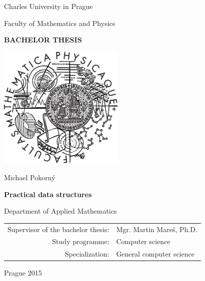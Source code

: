\documentclass[12pt,a4paper]{report}
\begin{document}


\pagestyle{empty}
\begin{center}

\large

Charles University in Prague

\medskip

Faculty of Mathematics and Physics

\vfill

{\bf\Large BACHELOR THESIS}

\vfill

\centerline{\mbox{\includegraphics[width=60mm]{img/logo.eps}}}

\vfill
\vspace{5mm}

{\LARGE Michael Pokorný}

\vspace{15mm}

{\LARGE\bfseries Practical data structures}

\vfill

Department of Applied Mathematics

\vfill

\begin{tabular}{rl}

Supervisor of the bachelor thesis: & Mgr. Martin Mareš, Ph.D. \\
\noalign{\vspace{2mm}}
Study programme: & Computer science \\
\noalign{\vspace{2mm}}
Specialization: & General computer science \\
\end{tabular}

\vfill

Prague 2015

\end{center}
\end{document}
